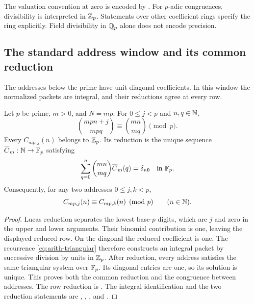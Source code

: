 The valuation convention at zero is encoded by
.  For $p$-adic
congruences, divisibility is interpreted in $\mathbb Z_p$. Statements over other
coefficient rings specify the ring explicitly.  Field divisibility in
$\mathbb Q_p$ alone does not encode precision.

\subsection{The standard address window and its common reduction}

The addresses below the prime have unit diagonal coefficients.  In this
window the normalized packets are integral, and their reductions agree
at every row.

\begin{proposition}
\label{prop:arith-lucas-window}
Let $p$ be prime, $m>0$, and $N=mp$.  For $0\le j<p$ and $n,q\in\mathbb N$,
\[
 \binom{mpn+j}{mpq}\equiv\binom{mn}{mq}\pmod p.
\]
Every $C_{mp,j}(n)$ belongs to $\mathbb Z_p$.  Its reduction is the unique
sequence $\overline C_m:\mathbb N\to\mathbb F_p$ satisfying
\[
 \sum_{q=0}^{n}\binom{mn}{mq}\overline C_m(q)=\delta_{n0}
 \quad\text{in }\mathbb F_p.
\]
Consequently, for any two addresses $0\le j,k<p$,
\[
 C_{mp,j}(n)\equiv C_{mp,k}(n)\pmod p\qquad(n\in\mathbb N).
\]
\end{proposition}

\begin{proof}
Lucas reduction separates the lowest base-$p$ digits, which are $j$ and
zero in the upper and lower arguments.  Their binomial contribution is
one, leaving the displayed reduced row.  On the diagonal the reduced
coefficient is one.  The recurrence \eqref{eq:arith-triangular} therefore
constructs an integral packet by successive division by units in $\mathbb Z_p$.
After reduction, every address satisfies the same triangular system over
$\mathbb F_p$.  Its diagonal entries are one, so its solution is unique.  This
proves both the common reduction and the congruence between addresses.
The row reduction is
.
The integral identification and the two reduction statements are
,
,
, and
.
\end{proof}

